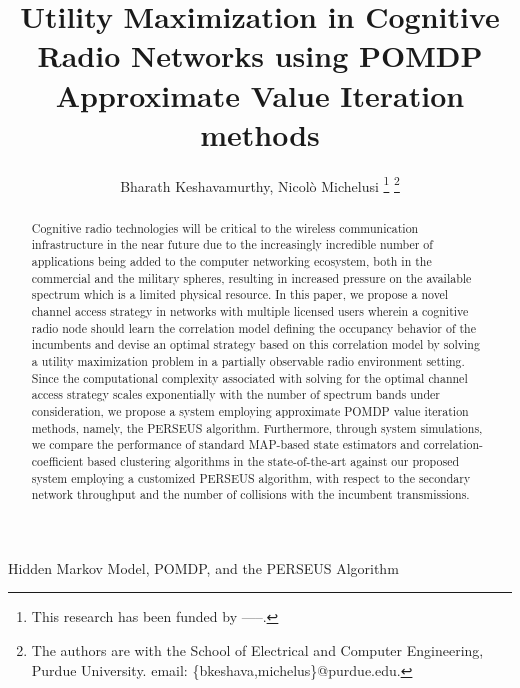 \documentclass[10pt,twocolumn]{IEEEtran}
\title{Utility Maximization in Cognitive Radio Networks using POMDP Approximate Value Iteration methods}
\author{Bharath Keshavamurthy, Nicol\`{o} Michelusi
\thanks{This research has been funded by -----.}
\thanks{The authors are with the School of Electrical and Computer Engineering, Purdue University. email: \{bkeshava,michelus\}@purdue.edu.}
}
\begin{document}
 
\maketitle
{}
\begin{abstract}
Cognitive radio technologies will be critical to the wireless communication infrastructure in the near future due to the increasingly incredible number of applications being added to the computer networking ecosystem, both in the commercial and the military spheres, resulting in increased pressure on the available spectrum which is a limited physical resource. In this paper, we propose a novel channel access strategy in networks with multiple licensed users wherein a cognitive radio node should learn the correlation model defining the occupancy behavior of the incumbents and devise an optimal strategy based on this correlation model by solving a utility maximization problem in a partially observable radio environment setting. Since the computational complexity associated with solving for the optimal channel access strategy scales exponentially with the number of spectrum bands under consideration, we propose a system employing approximate POMDP value iteration methods, namely, the PERSEUS algorithm. Furthermore, through system simulations, we compare the performance of standard MAP-based state estimators and correlation-coefficient based clustering algorithms in the state-of-the-art against our proposed system employing a customized PERSEUS algorithm, with respect to the secondary network throughput and the number of collisions with the incumbent transmissions.
\end{abstract}
\begin{IEEEkeywords}
Hidden Markov Model, POMDP, and the PERSEUS Algorithm
\end{IEEEkeywords}
\end{document}
